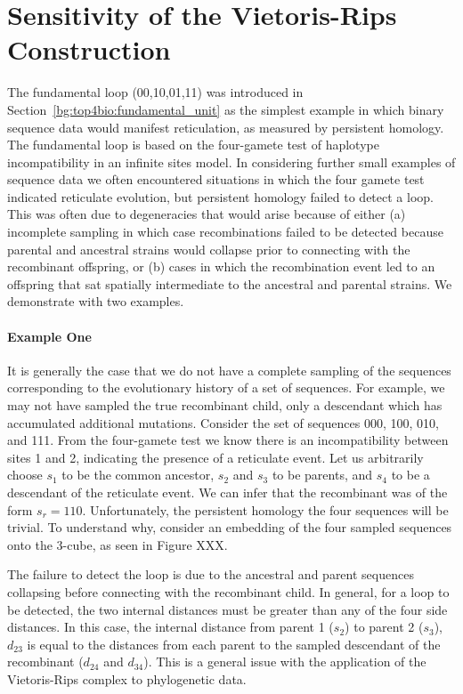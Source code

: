 \section{Sensitivity of the Vietoris-Rips Construction}
\label{complex_construction:sensitivity}

The fundamental loop (00,10,01,11) was introduced in Section~\ref{bg:top4bio:fundamental_unit} as the simplest example in which binary sequence data would manifest reticulation, as measured by persistent homology.
The fundamental loop is based on the four-gamete test of haplotype incompatibility in an infinite sites model.
In considering further small examples of sequence data we often encountered situations in which the four gamete test indicated reticulate evolution, but persistent homology failed to detect a loop.
This was often due to degeneracies that would arise because of either (a) incomplete sampling in which case recombinations failed to be detected because parental and ancestral strains would collapse prior to connecting with the recombinant offspring, or (b) cases in which the recombination event led to an offspring that sat spatially intermediate to the ancestral and parental strains.
We demonstrate with two examples.

\paragraph{Example One}
\label{ex:example1}
%
It is generally the case that we do not have a complete sampling of the sequences corresponding to the evolutionary history of a set of sequences.
For example, we may not have sampled the true recombinant child, only a descendant which has accumulated additional mutations.
Consider the set of sequences 000, 100, 010, and 111.
From the four-gamete test we know there is an incompatibility between sites 1 and 2, indicating the presence of a reticulate event.
Let us arbitrarily choose $s_1$ to be the common ancestor, $s_2$ and $s_3$ to be parents, and $s_4$ to be a descendant of the reticulate event.
We can infer that the recombinant was of the form $s_r=110$.
Unfortunately, the persistent homology the four sequences will be trivial.
To understand why, consider an embedding of the four sampled sequences onto the 3-cube, as seen in Figure XXX.

The failure to detect the loop is due to the ancestral and parent sequences collapsing before connecting with the recombinant child.
In general, for a loop to be detected, the two internal distances must be greater than any of the four side distances.
In this case, the internal distance from parent 1 ($s_2$) to parent 2 ($s_3$), $d_{23}$ is equal to the distances from each parent to the sampled descendant of the recombinant ($d_{24}$ and $d_{34}$).
This is a general issue with the application of the Vietoris-Rips complex to phylogenetic data.

